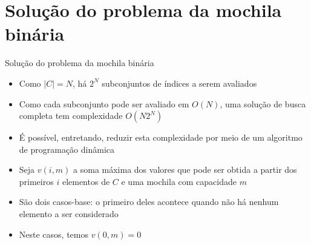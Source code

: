 \section{Solução do problema da mochila binária}

\begin{frame}[fragile]{Solução do problema da mochila binária}

    \begin{itemize}
        \item Como $|C| = N$, há $2^N$ subconjuntos de índices a serem avaliados

        \item Como cada subconjunto pode ser avaliado em $O(N)$, uma solução de busca
            completa tem complexidade $O(N2^N)$

        \item É possível, entretando, reduzir esta complexidade por meio de um algoritmo
            de programação dinâmica

        \item Seja $v(i, m)$ a soma máxima dos valores que pode ser obtida a partir dos
            primeiros $i$ elementos de $C$ e uma mochila com capacidade $m$

        \item São dois casos-base: o primeiro deles acontece quando não há nenhum
            elemento a ser considerado

        \item Neste casos, temos $v(0, m) = 0$
    \end{itemize}

\end{frame}


